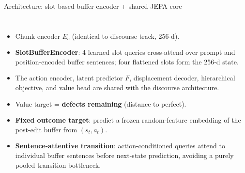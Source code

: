 \documentclass[aspectratio=169,10pt]{beamer}
\begin{document}
\begin{frame}{Architecture: slot-based buffer encoder + shared JEPA core}
\begin{columns}
\footnotesize
\begin{itemize}\itemsep2pt
  \item Chunk encoder $E_c$ (identical to discourse track, 256-d).
  \item \textbf{SlotBufferEncoder}: 4 learned slot queries cross-attend
        over prompt and position-encoded buffer sentences; four flattened
        slots form the 256-d state.
  \item The action encoder, latent predictor $F$, displacement decoder,
        hierarchical objective, and value head are shared with the discourse
        architecture.
  \item Value target = \textbf{defects remaining} (distance to perfect).
  \item \textbf{Fixed outcome target}: predict a frozen random-feature
        embedding of the post-edit buffer from $(s_t,a_t)$.
  \item \textbf{Sentence-attentive transition}: action-conditioned queries
        attend to individual buffer sentences before next-state prediction,
        avoiding a purely pooled transition bottleneck.
\end{itemize}
\centering
{}
\end{columns}
\end{frame}
\end{document}
